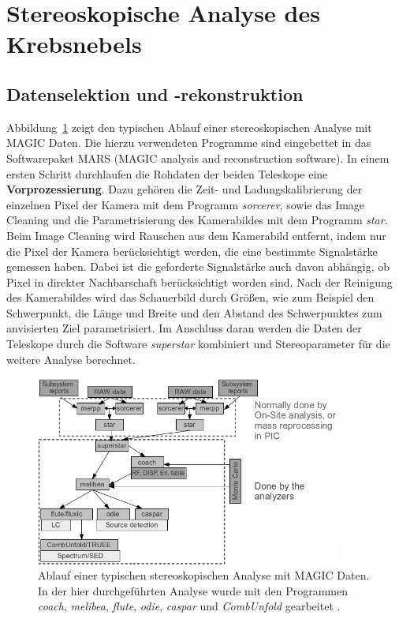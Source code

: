 \section{Stereoskopische Analyse des Krebsnebels}
\label{sec:analyse}

\subsection{Datenselektion und -rekonstruktion}

Abbildung~\ref{fig:analysischain} zeigt den typischen Ablauf einer
stereoskopischen Analyse mit MAGIC Daten. Die hierzu verwendeten Programme sind
eingebettet in das Softwarepaket MARS (MAGIC analysis and reconstruction
software). In einem ersten Schritt durchlaufen die
Rohdaten der beiden Teleskope eine \textbf{Vorprozessierung}. Dazu gehören die
Zeit- und Ladungskalibrierung der einzelnen Pixel der Kamera mit dem Programm
\textit{sorcerer}, sowie das Image Cleaning und die Parametrisierung des
Kamerabildes mit dem Programm \textit{star}. Beim Image Cleaning wird Rauschen
aus dem Kamerabild entfernt, indem nur die Pixel der Kamera berücksichtigt
werden, die eine bestimmte Signalstärke gemessen haben. Dabei ist die geforderte
Signalstärke auch davon abhängig, ob Pixel in direkter Nachbarschaft
berücksichtigt worden sind. Nach der Reinigung des Kamerabildes wird das
Schauerbild durch Größen, wie zum Beispiel den Schwerpunkt, die Länge und
Breite und den Abstand des Schwerpunktes zum anvisierten Ziel parametrisiert.
Im Anschluss daran werden die Daten der Teleskope durch die Software
\textit{superstar} kombiniert und Stereoparameter für die weitere Analyse
berechnet.

\begin{figure}
  \centering
  \includegraphics[width=0.9\textwidth]{figures/analysischain.png}
  \caption{Ablauf einer typischen stereoskopischen Analyse mit MAGIC Daten. In
  der hier durchgeführten Analyse wurde mit den Programmen \textit{coach},
  \textit{melibea}, \textit{flute}, \textit{odie}, \textit{caspar} und
  \textit{CombUnfold} gearbeitet \cite{magic_wiki}.} %
  \label{fig:analysischain}
\end{figure}

